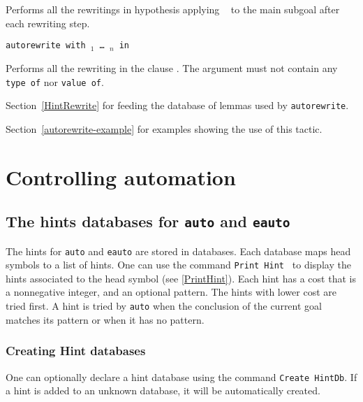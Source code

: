 \begin{coq_example*}
\begin{Variant}
  Performs all  the rewritings  in hypothesis {\qualid}  applying {\tt
    \tac} to the main subgoal after each rewriting step.

\item {\tt autorewrite with \ident$_1$ \mbox{\dots} \ident$_n$ in }

  Performs all the rewriting  in the clause .
  The  argument must not contain any \texttt{type of} nor \texttt{value of}.

\end{Variant}

\SeeAlso Section~\ref{HintRewrite} for feeding the database of lemmas used by {\tt autorewrite}.

\SeeAlso Section~\ref{autorewrite-example} for examples showing the use of
this tactic.


\section{Controlling automation}

\subsection{The hints databases for {\tt auto} and {\tt eauto}}
\label{Hints-databases}

The hints for \texttt{auto} and \texttt{eauto} are stored in
databases.  Each database maps head symbols to a list of hints. One can
use the command \texttt{Print Hint \ident} to display the hints
associated to the head symbol \ident{} (see \ref{PrintHint}). Each
hint has a cost that is a nonnegative integer, and an optional pattern.
The hints with lower cost are tried first. A hint is tried by
\texttt{auto} when the conclusion of the current goal
matches its pattern or when it has no pattern.

\subsubsection*{Creating Hint databases
  \label{CreateHintDb}}

One can optionally declare a hint database using the command
\texttt{Create HintDb}. If a hint is added to an unknown database, it
will be automatically created.


\end{coq_example*}
